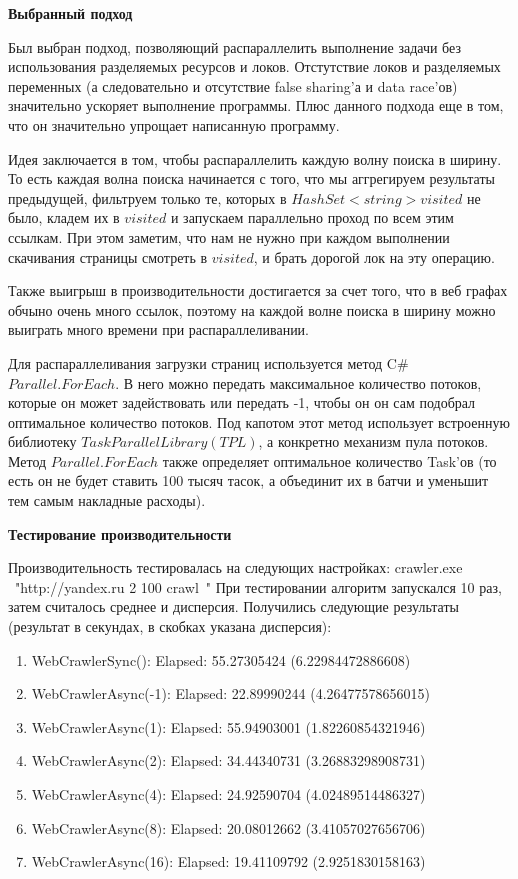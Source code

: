 \documentclass{article}
\begin{document}
    \textbf {Выбранный подход}

    Был выбран подход, позволяющий распараллелить выполнение задачи без использования разделяемых ресурсов и локов.
    Отстутствие локов и разделяемых переменных (а следовательно и отсутствие false sharing'а и data race'ов) значительно
    ускоряет выполнение программы.
    Плюс данного подхода еще в том, что он значительно упрощает написанную программу.

    Идея заключается в том, чтобы распараллелить каждую волну поиска в ширину.
    То есть каждая волна поиска начинается с того, что мы аггрегируем результаты предыдущей, фильтруем только те,
    которых в $HashSet<string> visited$ не было, кладем их в $visited$ и запускаем параллельно проход по всем этим ссылкам.
    При этом заметим, что нам не нужно при каждом выполнении скачивания страницы смотреть в $visited$, и брать дорогой
    лок на эту операцию.

    Также выигрыш в производительности достигается за счет того, что в веб графах обчыно очень много ссылок, поэтому на
    каждой волне поиска в ширину можно выиграть много времени при распараллеливании.

    Для распараллеливания загрузки страниц используется метод C\# $Parallel.ForEach$.
    В него можно передать максимальное количество потоков, которые он может задействовать или передать -1,
    чтобы он он сам подобрал оптимальное количество потоков.
    Под капотом этот метод использует встроенную библиотеку $Task Parallel Library (TPL)$, а конкретно механизм пула потоков.
    Метод $Parallel.ForEach$ также определяет оптимальное количество Task'ов (то есть он не будет ставить 100 тысяч тасок, а объединит их в батчи и уменьшит тем самым накладные расходы).

    \textbf {Тестирование производительности}

    Производительность тестировалась на следующих настройках: crawler.exe \ "http://yandex.ru 2 100 crawl\ "
    При тестировании алгоритм запускался 10 раз, затем считалось среднее и дисперсия.
    Получились следующие результаты (результат в секундах, в скобках указана дисперсия):

    \begin{enumerate}
        \item WebCrawlerSync(): Elapsed: 55.27305424 (6.22984472886608)
        \item WebCrawlerAsync(-1): Elapsed: 22.89990244 (4.26477578656015)
        \item WebCrawlerAsync(1): Elapsed: 55.94903001 (1.82260854321946)
        \item WebCrawlerAsync(2): Elapsed: 34.44340731 (3.26883298908731)
        \item WebCrawlerAsync(4): Elapsed: 24.92590704 (4.02489514486327)
        \item WebCrawlerAsync(8): Elapsed: 20.08012662 (3.41057027656706)
        \item WebCrawlerAsync(16): Elapsed: 19.41109792 (2.9251830158163)
    \end{enumerate}
\end{document}
